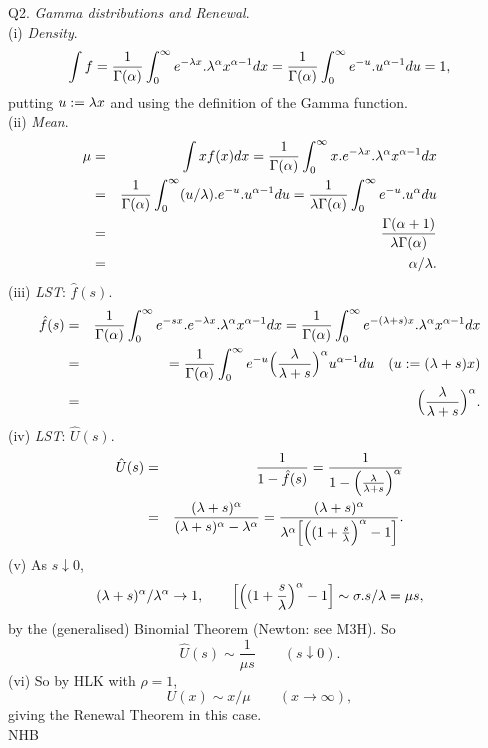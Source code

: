 \documentclass[12pt]{article}
\begin{document}
\ni Q2.  {\it Gamma distributions and Renewal}. \\
(i) {\it Density}.
$$
\int f 
= \frac{1}{\Gamma(\alpha)} \int_0^{\infty} e^{-\lambda x}.{\lambda}^{\alpha} x^{\alpha - 1} dx 
= \frac{1}{\Gamma(\alpha)} \int_0^{\infty} e^{-u}. u^{\alpha - 1} du = 1,
$$
putting $u := \lambda x$ and using the definition of the Gamma function. \\
(ii) {\it Mean}.
\begin{eqnarray*}
\mu &=& \int x f(x) dx = \frac{1}{\Gamma(\alpha)} \int_0^{\infty} x. e^{-\lambda x}.{\lambda}^{\alpha} x^{\alpha - 1} dx \\
&=& \frac{1}{\Gamma(\alpha)} \int_0^{\infty} (u/\lambda). e^{-u}.u^{\alpha - 1} du 
= \frac{1}{\lambda \Gamma(\alpha)} \int_0^{\infty} e^{-u}.u^{\alpha} du \\ 
&=& \frac{\Gamma(\alpha + 1)}{\lambda \Gamma(\alpha)} \\
&=& \alpha/\lambda.
\end{eqnarray*} 
(iii) {\it LST}: $\hat f(s)$. 
\begin{eqnarray*}
\hat f(s) 
&=& \frac{1}{\Gamma(\alpha)} \int_0^{\infty} e^{-sx}.e^{-\lambda x}.{\lambda}^{\alpha} x^{\alpha - 1} dx   
= \frac{1}{\Gamma(\alpha)} \int_0^{\infty} e^{-(\lambda + s)x}.{\lambda}^{\alpha} x^{\alpha - 1} dx \\
&=& = \frac{1}{\Gamma(\alpha)} \int_0^{\infty} e^{-u} \Bigl( \frac{\lambda}{\lambda + s} \Bigr)^{\alpha} u^{\alpha - 1} du 
\quad (u := (\lambda + s)x) \\
&=& \Bigl( \frac{\lambda}{\lambda + s} \Bigr)^{\alpha}.
\end{eqnarray*}
(iv) {\it LST}: $\hat U(s)$. 
\begin{eqnarray*}
\hat U(s)
&=& \frac{1}{1 - \hat f(s)}
= \frac{1}{1 - \Bigl( \frac{\lambda}{\lambda + s} \Bigr)^{\alpha}} \\
&=& \frac{(\lambda + s)^{\alpha}}{(\lambda + s)^{\alpha} - {\lambda}^{\alpha}}
= \frac{(\lambda + s)^{\alpha}}{{\lambda}^{\alpha}\Bigl[ \Bigl( (1 + \frac{s}{\lambda} \Bigr)^{\alpha} - 1 \Bigr] }.
\end{eqnarray*}
(v) As $s \downarrow 0$,
$$
(\lambda + s)^{\alpha}/{\lambda}^{\alpha} \to 1, \qquad \Bigl[ \Bigl( (1 + \frac{s}{\lambda} \Bigr)^{\alpha} - 1 \Bigr] \sim \sigma.s/\lambda = \mu s,
$$
by the (generalised) Binomial Theorem (Newton: see M3H).  So
$$
\hat U(s) \sim \frac{1}{\mu s} \qquad (s \downarrow 0).
$$
(vi) So by HLK with $\rho = 1$,
$$
U(x) \sim x/\mu \qquad (x \to \infty),
$$
giving the Renewal Theorem in this case. \\ 

\hfil NHB \break
\end{document}
